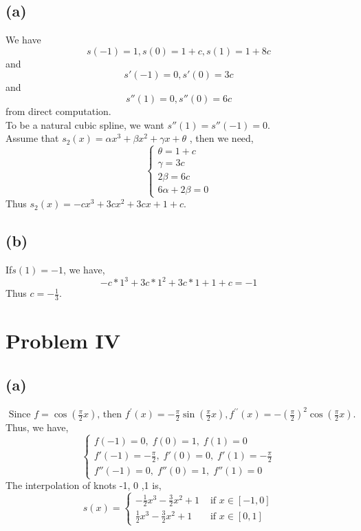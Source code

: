 \documentclass[UTF8]{ctexart}
\begin{document}
\subsection*{(a)}
\noindent We have $$s(-1) = 1,s(0) = 1+c , s(1) = 1 + 8c$$ and $$s'(-1) = 0, s'(0) = 3c $$ and $$s''(1) = 0, s''(0) = 6c$$ from direct computation.\\
\noindent To be a natural cubic spline, we want $s''(1) = s''(-1) = 0.$\\
\noindent Assume that $s_2(x) = \alpha x^3+\beta x^2+\gamma x+\theta$ , then we need,
\begin{equation}
    \left\{\begin{array}{l}
        \theta=1+c \\
        \gamma=3 c \\
        2 \beta=6 c \\
        6 \alpha+2 \beta=0
    \nonumber
    \end{array}\right.
\end{equation}
\noindent Thus $s_2(x) = -cx^3 + 3cx^2+3cx+1+c$.

\subsection*{(b)}
\noindent If$s(1) = -1$, we have,
$$-c*1^3+3c*1^2+3c*1+1+c = -1$$
Thus $c=-\frac{1}{3}$.

\section*{Problem IV}
\subsection*{(a)}
\noindent $\text { Since } f=\cos \left(\frac{\pi}{2} x\right) \text {, then } f^{\prime}(x)=-\frac{\pi}{2} \sin \left(\frac{\pi}{2} x\right), f^{\prime \prime}(x)=-\left(\frac{\pi}{2}\right)^{2} \cos \left(\frac{\pi}{2} x\right) \text {. }$
Thus, we have,
\begin{equation}
    \left\{\begin{array}{l}
         f(-1) = 0,\;f(0)=1,\;f(1)=0 \\
         f'(-1) = -\frac{\pi}{2},\;f'(0)=0,\;f'(1) = -\frac{\pi}{2}\\
         f''(-1)=0,\;f''(0)=1,\;f''(1)=0
    \nonumber
    \end{array}\right.
\end{equation}
The interpolation of knots -1, 0 ,1 is,
\begin{equation}
    s(x)=
    \left\{\begin{array}{ll}
        -\frac{1}{2} x^{3}-\frac{3}{2} x^{2}+1 & \text { if } x \in[-1,0] \\
        \frac{1}{2} x^{3}-\frac{3}{2} x^{2}+1 & \text { if } x \in[0,1]
    \nonumber
    \end{array}\right.
\end{equation}
\end{document}
